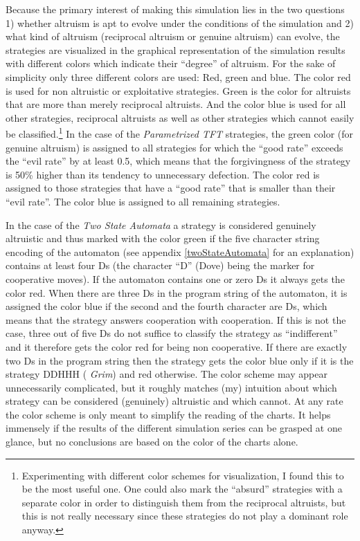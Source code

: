 Because the primary interest of making this simulation lies in the two
questions 1) whether altruism is apt to evolve under the conditions of
the simulation and 2) what kind of altruism (reciprocal altruism or genuine
altruism) can evolve, the strategies are visualized in the graphical
representation of the simulation results with different colors which indicate
their ``degree'' of altruism.\label{colorScheme} For the sake of simplicity
only three different
colors are used: Red, green and blue. The color red is used for non altruistic
or exploitative strategies. Green is the color for altruists that are more
than merely reciprocal altruists. And the color blue is used for all other
strategies, reciprocal altruists as well as other strategies which cannot
easily be classified.\footnote{Experimenting with different color schemes for
  visualization, I found this to be the most useful one. One could also mark
  the ``absurd'' strategies with a separate color in order to distinguish them
  from the reciprocal altruists, but this is not really necessary since these
  strategies do not play a dominant role anyway.} In the case of the {\em
  Parametrized TFT} strategies, the green color (for genuine altruism) is
assigned to all strategies for which the ``good rate'' exceeds the ``evil
rate'' by at least 0.5, which means that the forgivingness of the strategy is
50\% higher than its tendency to unnecessary defection. The color red is
assigned to those strategies that have a ``good rate'' that is smaller than
their ``evil rate''. The color blue is assigned to all remaining strategies.

In the case of the {\em Two State Automata} a strategy is considered genuinely
altruistic and thus marked with the color green if the five character string
encoding of the automaton (see appendix \ref{twoStateAutomata} for an
explanation) contains at least four Ds (the character ``D'' (Dove) being
the marker for cooperative moves). If the automaton contains one or zero Ds it
always gets the color red. When there are three Ds in the program string of
the automaton, it is assigned the color blue if the second and the fourth
character are Ds, which means that the strategy answers cooperation with
cooperation. If this is not the case, three out of five Ds do not suffice to
classify the strategy as ``indifferent'' and it therefore gets the color red
for being non cooperative. If there are exactly two Ds in the program string
then the strategy gets the color blue only if it is the strategy DDHHH ({\em
  Grim}) and red otherwise. The color scheme may appear unnecessarily
complicated, but it roughly matches (my) intuition about which strategy can be
considered (genuinely) altruistic and which cannot. At any rate the color
scheme is only meant to simplify the reading of the charts. It helps immensely
if the results of the different simulation series can be grasped at one
glance, but no conclusions are based on the color of the charts alone.

